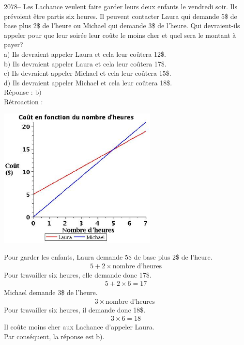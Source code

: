 \documentclass[letterpaper, 12pt]{article}
\begin{document}
2078-- Les Lachance veulent faire garder leurs deux enfants le vendredi soir. Ils pr\'evoient \^etre partis six heures. Il peuvent contacter Laura qui demande 5\$ de base plus 2\$ de l'heure ou Michael qui demande 3\$ de l'heure. Qui devraient-ils appeler pour que leur soir\'ee leur co\^ute le moins cher et quel sera le montant \`a payer?\\

a$)$ Ils devraient appeler Laura et cela leur co\^utera 12\$. \\
b$)$ Ils devraient appeler Laura et cela leur co\^utera 17\$. \\
c$)$ Ils devraient appeler Michael et cela leur co\^utera 15\$. \\
d$)$ Ils devraient appeler Michael et cela leur co\^utera 18\$. \\

R\'eponse : b$)$\\

R\'etroaction :\\
\begin{center}
 \includegraphics[width=8cm,bb=14 14 465 415]{Q2078.eps}
\end{center}
Pour garder les enfants, Laura demande 5\$ de base plus 2\$ de l'heure.
\begin{eqnarray*}
 5+2\times \textrm{nombre d'heures}
\end{eqnarray*}
Pour travailler six heures, elle demande donc 17\$.
\begin{eqnarray*}
 5+2\times 6 = 17
\end{eqnarray*}
Michael demande 3\$ de l'heure.
\begin{eqnarray*}
 3\times \textrm{nombre d'heures }
\end{eqnarray*}
Pour travailler six heures, il demande donc 18\$.
\begin{eqnarray*}
 3\times 6 = 18
\end{eqnarray*}
Il co\^ute moins cher aux Lachance d'appeler Laura.\\
Par cons\'equent, la r\'eponse est b).\\
\end{document}
